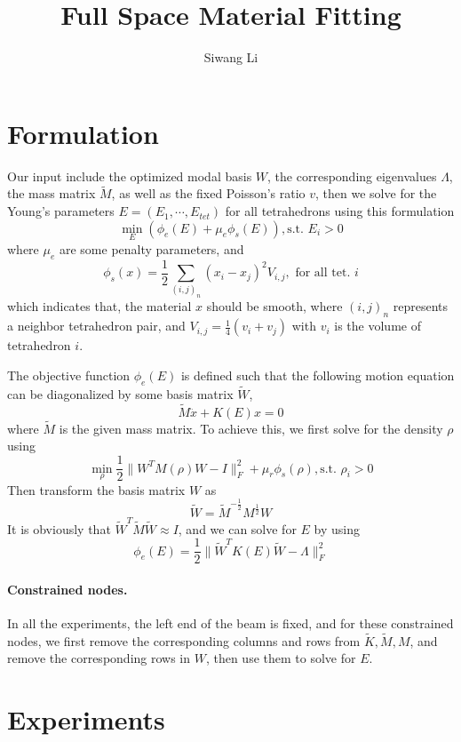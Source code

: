 \documentclass[9pt,twocolumn]{extarticle}
\author{Siwang Li}
\title{Full Space Material Fitting}
\begin{document}
\maketitle

\setlength{\parskip}{0.5ex}

\section{Formulation}
Our input include the optimized modal basis $W$, the corresponding eigenvalues
$\Lambda$, the mass matrix $\tilde{M}$, as well as the fixed Poisson's ratio
$v$, then we solve for the Young's parameters $E=(E_1,\cdots,E_{tet})$ for all
tetrahedrons using this formulation
\begin{equation} \label{all}
  \min_{E}(\phi_e(E)+\mu_{e}\phi_s(E)), \mbox{s.t. } E_i>0
\end{equation}
where $\mu_e$ are some penalty parameters, and
\begin{equation} \label{smooth}
  \phi_s(x) = \frac{1}{2}\sum_{(i,j)_{n}}(x_i-x_j)^2V_{i,j}, \mbox{ for all
    tet. }i
\end{equation}
which indicates that, the material $x$ should be smooth, where $(i,j)_{n}$ represents a
neighbor tetrahedron pair, and $V_{i,j}=\frac{1}{4}(v_i+v_j)$ with $v_i$ is the
volume of tetrahedron $i$. 

The objective function $\phi_e(E)$ is defined such that the following motion
equation can be diagonalized by some basis matrix $\tilde{W}$,
\begin{equation} \label{motion_eq}
  \tilde{M}\ddot{x} + K(E)x = 0
\end{equation}
where $\tilde{M}$ is the given mass matrix. To achieve this, we first solve for
the density $\rho$ using 
\begin{equation} \label{mass}
   \min_{\rho}\frac{1}{2}\|W^TM(\rho)W-I\|_F^2+\mu_{r}\phi_s(\rho), \mbox{s.t. }
   \rho_i>0
\end{equation}
Then transform the basis matrix $W$ as
\begin{equation} \label{W_ext}
  \tilde{W}=\tilde{M}^{-\frac{1}{2}}M^{\frac{1}{2}}W
\end{equation}
It is obviously that $\tilde{W}^T\tilde{M}\tilde{W}\approx I$, and we can solve
for $E$ by using
\begin{equation} \label{diag_k}
  \phi_e(E) = \frac{1}{2}\|\tilde{W}^TK(E)\tilde{W}-\Lambda\|_F^2
\end{equation}

\paragraph{Constrained nodes.}
In all the experiments, the left end of the beam is fixed, and for these
constrained nodes, we first remove the corresponding columns and rows from
$\tilde{K}, \tilde{M}, M$, and remove the corresponding rows in $W$, then use
them to solve for $E$.

\section{Experiments}
\end{document}
